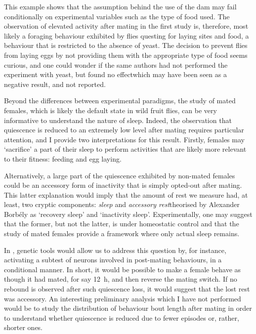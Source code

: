 This example shows that the assumption behind the use of the \gls{dam} may fail conditionally on experimental variables such as the type of food used. 
The observation of elevated activity after mating in the first study is, therefore, most likely a foraging behaviour exhibited by flies questing for laying sites and food, a behaviour that is restricted to the absence of yeast.
The decision to prevent flies from laying eggs by not providing them with the appropriate type of food seems curious, and one could wonder if the same authors had not performed the experiment with yeast, but found no effect\emd{}which may have been seen as a negative result, and not reported.

Beyond the differences between experimental paradigms, the study of mated females, which is likely the default state in wild fruit flies\cite{giardina_estimating_nodate}, can be very informative to understand the nature of sleep.
Indeed, the observation that quiescence is reduced to an extremely low level after mating requires particular attention, and I provide two interpretations for this result.
Firstly, females may `sacrifice' a part of their sleep to perform activities that are likely more relevant to their fitness: feeding and egg laying.

Alternatively, a large part of the quiescence exhibited by non-mated females could be an accessory form of inactivity that is simply opted-out after mating.
This latter explanation would imply that the amount of rest we measure had, at least, two cryptic components:
\emph{sleep} and \emph{accessory rest}\emd{}theorised by Alexander Borbély as `recovery sleep' and `inactivity sleep'\cite{borbely1980sleep}.
Experimentally, one may suggest that the former, but not the latter, is under homeostatic control
and that the study of mated females provide a framework where only actual sleep remains.

In \droso, genetic tools would allow us to address this question by, for instance, activating a subtest of neurons involved in post-mating behaviours, in a conditional manner. 
In short, it would be possible to make a female behave as though it had mated, for say 12~h, and then reverse the mating switch\cite{rezaval_sexually_2014}.
If no rebound is observed after such quiescence loss, it would suggest that the lost rest was accessory. 
An interesting preliminary analysis which I have not performed would be to study the distribution of behaviour bout length after mating in order to understand whether quiescence is reduced due to fewer episodes or, rather, shorter ones.

